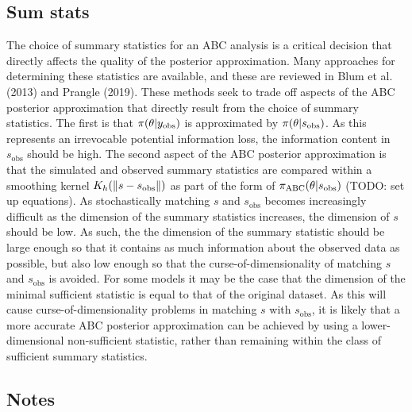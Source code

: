 \subsection{Sum stats}

The choice of summary statistics for an ABC analysis is a critical decision that directly affects the quality of the posterior approximation. Many approaches for determining these statistics are available, and these are reviewed in Blum et al. (2013) and Prangle (2019). These methods seek to trade off aspects of the ABC posterior approximation that directly result from the choice of summary statistics. The first is that $\pi \qty(\theta | y_\mathrm{obs})$ is approximated by $\pi \qty(\theta | s_\mathrm{obs})$. As this represents an irrevocable potential information loss, the information content in $s_\mathrm{obs}$ should be high. The second aspect of the ABC posterior approximation is that the simulated and observed summary statistics are compared within a smoothing kernel $K_h \qty(\norm{s - s_\mathrm{obs}})$ as part of the form of $\pi_\mathrm{ABC} \qty(\theta | s_\mathrm{obs})$ (TODO: set up equations). As stochastically matching $s$ and $s_\mathrm{obs}$ becomes increasingly difficult as the dimension of the summary statistics increases, the dimension of $s$ should be low. As such, the the dimension of the summary statistic should be large enough so that it contains as much information about the observed data as possible, but also low enough so that the curse-of-dimensionality of matching $s$ and $s_\mathrm{obs}$ is avoided. For some models it may be the case that the dimension of the minimal sufficient statistic is equal to that of the original dataset. As this will cause curse-of-dimensionality problems in matching $s$ with $s_\mathrm{obs}$, it is likely that a more accurate ABC posterior approximation can be achieved by using a lower-dimensional non-sufficient statistic, rather than remaining within the class of sufficient summary statistics.

\subsection{Notes}
